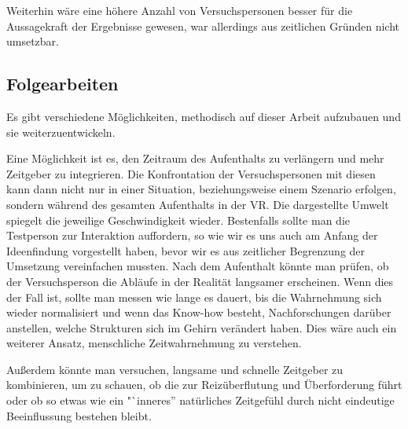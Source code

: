 \documentclass{Bericht}
\begin{document}
Weiterhin wäre eine höhere Anzahl von Versuchspersonen besser für die Aussagekraft der Ergebnisse gewesen, war allerdings aus zeitlichen Gründen nicht umsetzbar.

\subsection{Folgearbeiten}
Es gibt verschiedene Möglichkeiten, methodisch auf dieser Arbeit aufzubauen und sie weiterzuentwickeln.

Eine Möglichkeit ist es, den Zeitraum des Aufenthalts zu verlängern und mehr Zeitgeber zu integrieren. Die Konfrontation der Versuchspersonen mit diesen kann dann nicht nur in einer Situation, beziehungsweise einem Szenario erfolgen, sondern während des gesamten Aufenthalts in der VR. Die dargestellte Umwelt spiegelt die jeweilige Geschwindigkeit wieder. Bestenfalls sollte man die Testperson zur Interaktion auffordern, so wie wir es uns auch am Anfang der Ideenfindung vorgestellt haben, bevor wir es aus zeitlicher Begrenzung der Umsetzung vereinfachen mussten. Nach dem Aufenthalt könnte man prüfen, ob der Versuchsperson die Abläufe in der Realität langsamer erscheinen. Wenn dies der Fall ist, sollte man messen wie lange es dauert, bis die Wahrnehmung sich wieder normalisiert und wenn das Know-how besteht, Nachforschungen darüber anstellen, welche Strukturen sich im Gehirn verändert haben. Dies wäre auch ein weiterer Ansatz, menschliche Zeitwahrnehmung zu verstehen.

Außerdem könnte man versuchen, langsame und schnelle Zeitgeber zu  kombinieren, um zu schauen, ob die zur Reizüberflutung und Überforderung führt oder ob so etwas wie ein "`inneres'' natürliches Zeitgefühl durch nicht eindeutige Beeinflussung bestehen bleibt.
\end{document}
